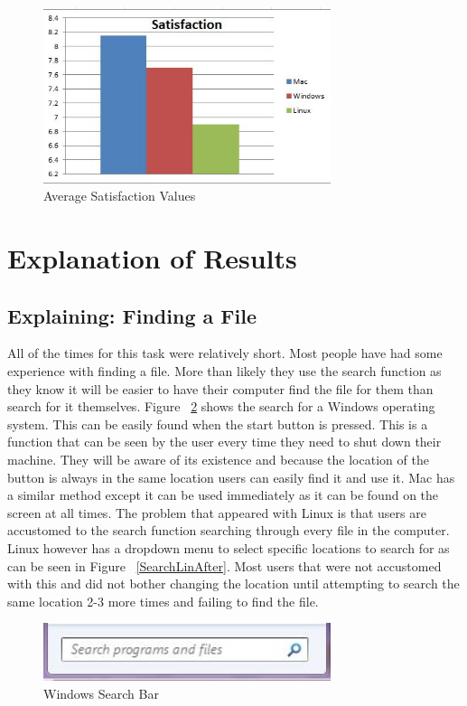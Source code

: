 \documentclass[11pt]{article}
\begin{document}
\begin{figure}[h!]
  \centering
    \includegraphics[width=0.75\textwidth]{./Images/Satisfaction}
  \caption{Average Satisfaction Values}
 \label{Satis}
\end{figure}

\section{Explanation of Results}


\subsection{Explaining: Finding a File}
All of the times for this task were relatively short. Most people have had some experience with finding a file. More than likely they use the search function as they know it will be easier to have their computer find the file for them than search for it themselves. Figure ~\ref{SearchWin} shows the search for a Windows operating system. This can be easily found when the start button is pressed. This is a function that can be seen by the user every time they need to shut down their machine. They will be aware of its existence and because the location of the button is always in the same location users can easily find it and use it. Mac has a similar method except it can be used immediately as it can be found on the screen at all times. The problem that appeared with Linux is that users are accustomed to the search function searching through every file in the computer. Linux however has a dropdown menu to select specific locations to search for as can be seen in Figure ~\ref{SearchLinAfter}. Most users that were not accustomed with this and did not bother changing the location until attempting to search the same location 2-3 more times and failing to find the file.

\begin{figure}[h!]
  \centering
    \includegraphics[width=0.75\textwidth]{./Images/Search_Windows}
  \caption{Windows Search Bar}
 \label{SearchWin}
\end{figure}
\end{document}
